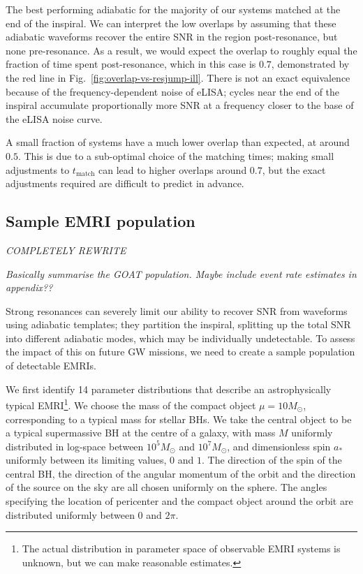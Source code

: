 \documentclass[aps,prd,amsfonts,amssymb,amsmath,nofootinbib,showpacs,superscriptaddress,twocolumn]{revtex4}
\newcommand{\figref}[1]{Fig.\ \ref{fig:#1}}
\begin{document}
The best performing adiabatic for the majority of our systems matched at the end of the inspiral. We can interpret the low overlaps by assuming that these adiabatic waveforms recover the entire SNR in the region post-resonance, but none pre-resonance. As a result, we would expect the overlap to roughly equal the fraction of time spent post-resonance, which in this case is $0.7$, demonstrated by the red line in \figref{overlap-vs-resjump-ill}. There is not an exact equivalence because of the frequency-dependent noise of eLISA; cycles near the end of the inspiral accumulate proportionally more SNR at a frequency closer to the base of the eLISA noise curve.

A small fraction of systems have a much lower overlap than expected, at around $0.5$. This is due to a sub-optimal choice of the matching times; making small adjustments to $t_\mathrm{match}$ can lead to higher overlaps around $0.7$, but the exact adjustments required are difficult to predict in advance.


\subsection{Sample EMRI population}

\emph{COMPLETELY REWRITE}

\emph{Basically summarise the GOAT population. Maybe include event rate estimates in appendix??}

Strong resonances can severely limit our ability to recover SNR from waveforms using adiabatic templates; they partition the inspiral, splitting up the total SNR into different adiabatic modes, which may be individually undetectable. To assess the impact of this on future GW missions, we need to create a sample population of detectable EMRIs.

We first identify 14 parameter distributions that describe an astrophysically typical EMRI\footnote{The actual distribution in parameter space of observable EMRI systems is unknown, but we can make reasonable estimates.}. We choose the mass of the compact object $\mu = 10 M_\odot$, corresponding to a typical mass for stellar BHs. We take the central object to be a typical supermassive BH at the centre of a galaxy, with mass $M$ uniformly distributed in log-space between $10^5 M_\odot$ and $10^7 M_\odot$, and dimensionless spin $a_\ast$ uniformly between its limiting values, $0$ and $1$. The direction of the spin of the central BH, the direction of the angular momentum of the orbit and the direction of the source on the sky are all chosen uniformly on the sphere. The angles specifying the location of pericenter and the compact object around the orbit are distributed uniformly between $0$ and $2\pi$.
\end{document}
